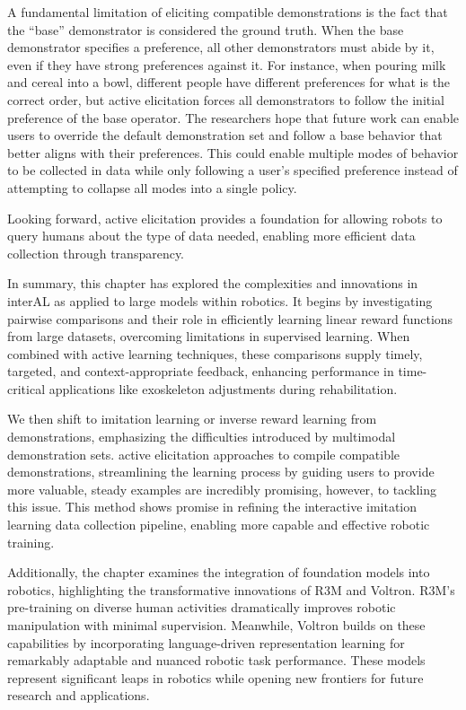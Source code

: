 \documentclass[
  letterpaper,
  numbers=noenddot,
  DIV=11]{scrreprt}
\theoremstyle{plain}
\theoremstyle{definition}
\theoremstyle{remark}
\begin{document}
A fundamental limitation of eliciting compatible demonstrations is the
fact that the ``base'' demonstrator is considered the ground truth. When
the base demonstrator specifies a preference, all other demonstrators
must abide by it, even if they have strong preferences against it. For
instance, when pouring milk and cereal into a bowl, different people
have different preferences for what is the correct order, but active
elicitation forces all demonstrators to follow the initial preference of
the base operator. The researchers hope that future work can enable
users to override the default demonstration set and follow a base
behavior that better aligns with their preferences. This could enable
multiple modes of behavior to be collected in data while only following
a user's specified preference instead of attempting to collapse all
modes into a single policy.

Looking forward, active elicitation provides a foundation for allowing
robots to query humans about the type of data needed, enabling more
efficient data collection through transparency.

In summary, this chapter has explored the complexities and innovations
in interAL as applied to large models within robotics. It begins by
investigating pairwise comparisons and their role in efficiently
learning linear reward functions from large datasets, overcoming
limitations in supervised learning. When combined with active learning
techniques, these comparisons supply timely, targeted, and
context-appropriate feedback, enhancing performance in time-critical
applications like exoskeleton adjustments during rehabilitation.

We then shift to imitation learning or inverse reward learning from
demonstrations, emphasizing the difficulties introduced by multimodal
demonstration sets. active elicitation approaches to compile compatible
demonstrations, streamlining the learning process by guiding users to
provide more valuable, steady examples are incredibly promising,
however, to tackling this issue. This method shows promise in refining
the interactive imitation learning data collection pipeline, enabling
more capable and effective robotic training.

Additionally, the chapter examines the integration of foundation models
into robotics, highlighting the transformative innovations of R3M and
Voltron. R3M's pre-training on diverse human activities dramatically
improves robotic manipulation with minimal supervision. Meanwhile,
Voltron builds on these capabilities by incorporating language-driven
representation learning for remarkably adaptable and nuanced robotic
task performance. These models represent significant leaps in robotics
while opening new frontiers for future research and applications.
\end{document}
